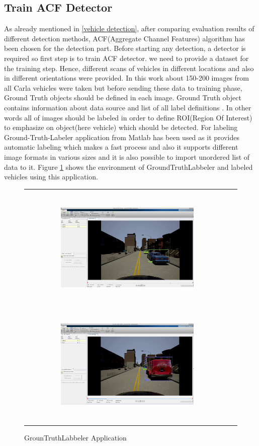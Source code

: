 \subsection{Train ACF Detector}
As already mentioned in \ref{vehicle detection}, after comparing evaluation results of different detection methods, ACF(Aggregate Channel Features) algorithm has been chosen for the detection part. Before starting any detection, a detector is required so first step is to train ACF detector. we need to provide a dataset for the training step. Hence, different scans of vehicles in different locations and also in different orientations were provided. In this work about 150-200 images from all Carla vehicles were taken but before sending these data to training phase, Ground Truth objects should be defined in each image. Ground Truth object contains information about data source and list of all label definitions \cite{GroundTruth}. In other words all of images should be labeled in order to define ROI(Region Of Interest) to emphasize on object(here vehicle) which should be detected. For labeling Ground-Truth-Labeler application from Matlab \cite{gTruthLabbeler} has been used as it provides automatic labeling which makes a fast process and also it supports different image formats in various sizes and it is also possible to import unordered list of data to it. Figure \ref{fig:labeling} shows the environment of GroundTruthLabbeler and labeled vehicles using this application.
\begin{figure}
\centering
    \begin{tabular}{c|c}
         \includegraphics[width=7cm, height=6cm]{images/labeling1.png} 
         \includegraphics[width=7cm, height=6cm]{images/labeling2.png}
    \end{tabular}
    \caption{GrounTruthLabbeler Application}
    \label{fig:labeling}
\end{figure}

